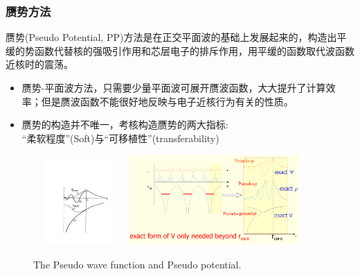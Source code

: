 \documentclass[cjk,slidestop,compress,mathserif,blue]{beamer}
\begin{document}
\frame
{
\frametitle{赝势方法}
赝势(\textrm{Pseudo Potential, PP})方法是在正交平面波的基础上发展起来的，构造出平缓的势函数代替核的强吸引作用和芯层电子的排斥作用，用平缓的函数取代波函数近核时的震荡。
\begin{itemize}
\setlength{\itemsep}{5pt}
	\item 赝势-平面波方法，只需要少量平面波可展开赝波函数，大大提升了计算效率；但是赝波函数不能很好地反映与电子近核行为有关的性质。
	\item 赝势的构造并不唯一，考核构造赝势的两大指标:~\\“柔软程度”\textrm{(Soft)}与“可移植性”\textrm{(transferability)}
\end{itemize}
\begin{figure}[h!]
\centering
\vspace*{-0.10in}
\includegraphics[height=1.35in,width=1.40in,viewport=154 100 562 508,clip]{Figures/Pseudo.pdf}
\includegraphics[height=1.35in,width=2.55in,viewport=1 1 980 500,clip]{Figures/Pseudo-2.png}
\caption{\tiny \textrm{The Pseudo wave function and Pseudo potential.}}%
\label{Pseudo_Potential-Wave}
\end{figure}
}
\end{document}
